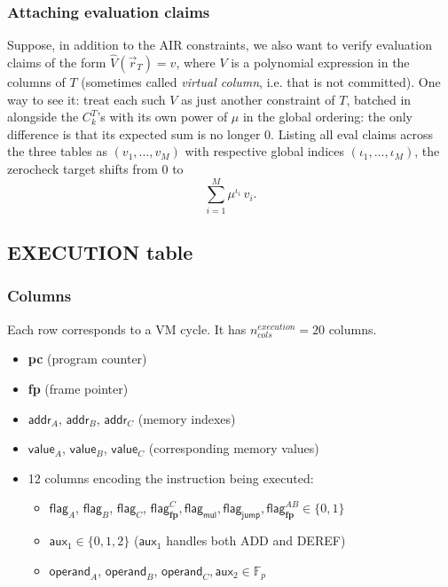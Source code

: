 \documentclass{article}
\theoremstyle{definition}
\newcommand{\Fp}{\mathbb F_p}
\begin{document}
\subsubsection{Attaching evaluation claims}\label{sec:air-eval}

Suppose, in addition to the AIR constraints, we also want to verify evaluation claims of the form $\hat{V}(\vec r_T) = v$, where $V$ is a polynomial expression in the columns of $T$ (sometimes called \emph{virtual column}, i.e. that is not committed). One way to see it: treat each such $V$ as just another constraint of $T$, batched in alongside the $C_k^T$'s with its own power of $\mu$ in the global ordering: the only difference is that its expected sum is no longer $0$. Listing all eval claims across the three tables as $(v_1, \dots, v_M)$ with respective global indices $(\iota_1, \dots, \iota_M)$, the zerocheck target shifts from $0$ to
\[
\sum_{i = 1}^{M} \mu^{\iota_i}\, v_i.
\]

\subsection{EXECUTION table}


\subsubsection{Columns}

 Each row corresponds to a VM cycle. It has $n_{cols}^{execution} = 20$ columns.

\begin{itemize}
    \item \textbf{pc} (program counter)
    \item \textbf{fp} (frame pointer)
    \item $\textsf{addr}_A$, $\textsf{addr}_B$, $\textsf{addr}_C$ (memory indexes)
    \item $\textsf{value}_A$, $\textsf{value}_B$, $\textsf{value}_C$ (corresponding memory values)
    \item 12 columns encoding the instruction being executed:
        \begin{itemize}
        \item $\textsf{flag}_A$, $\textsf{flag}_B$, $\textsf{flag}_C$, $\textsf{flag}^{C}_\textbf{fp}, \textsf{flag}_\textsf{mul}, \textsf{flag}_\textsf{jump}, \textsf{flag}^{AB}_\textbf{fp} \in \{0, 1\}$
        \item $\textsf{aux}_1 \in \{0, 1, 2\}$ ($\textsf{aux}_1$ handles both ADD and DEREF)
        \item $\textsf{operand}_A$, $\textsf{operand}_B$, $\textsf{operand}_C, \textsf{aux}_2 \in \Fp$
    \end{itemize}
\end{itemize}
\end{document}
